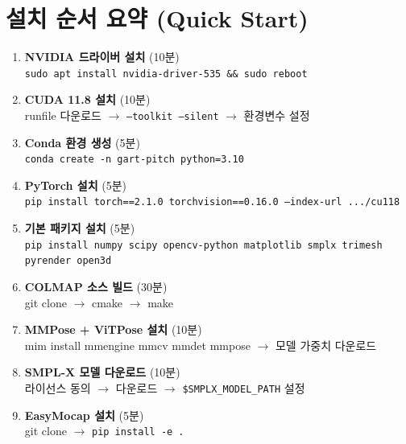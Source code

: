 \documentclass[11pt, a4paper]{report}
\begin{document}
\chapter{설치 순서 요약 (Quick Start)}
\label{ch:quickstart}

\begin{summary}[title={전체 설치 순서 (약 2--3시간)}]
\begin{enumerate}[leftmargin=*]
  \item \textbf{NVIDIA 드라이버 설치} (10분)\\
        \texttt{sudo apt install nvidia-driver-535 \&\& sudo reboot}

  \item \textbf{CUDA 11.8 설치} (10분)\\
        runfile 다운로드 $\rightarrow$ \texttt{--toolkit --silent} $\rightarrow$ 환경변수 설정

  \item \textbf{Conda 환경 생성} (5분)\\
        \texttt{conda create -n gart-pitch python=3.10}

  \item \textbf{PyTorch 설치} (5분)\\
        \texttt{pip install torch==2.1.0 torchvision==0.16.0 --index-url .../cu118}

  \item \textbf{기본 패키지 설치} (5분)\\
        \texttt{pip install numpy scipy opencv-python matplotlib smplx trimesh pyrender open3d}

  \item \textbf{COLMAP 소스 빌드} (30분)\\
        git clone $\rightarrow$ cmake $\rightarrow$ make

  \item \textbf{MMPose + ViTPose 설치} (10분)\\
        mim install mmengine mmcv mmdet mmpose $\rightarrow$ 모델 가중치 다운로드

  \item \textbf{SMPL-X 모델 다운로드} (10분)\\
        라이선스 동의 $\rightarrow$ 다운로드 $\rightarrow$ \texttt{\$SMPLX\_MODEL\_PATH} 설정

  \item \textbf{EasyMocap 설치} (5분)\\
        git clone $\rightarrow$ \texttt{pip install -e .}


\end{enumerate}
\end{summary}
\end{document}
